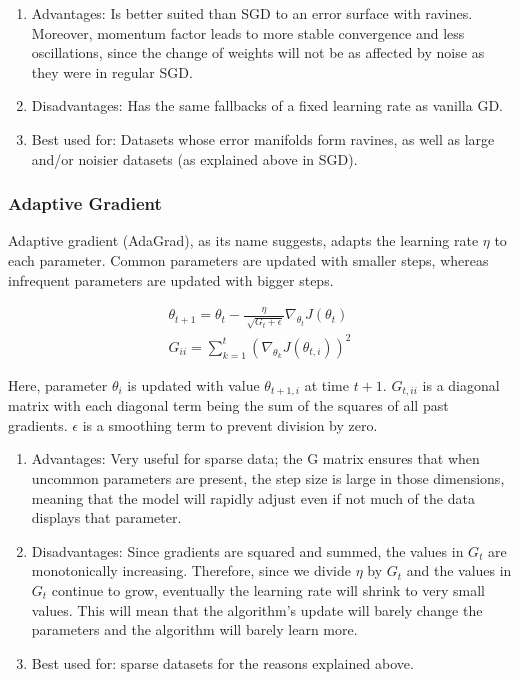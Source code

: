 \documentclass[twoside,11pt]{homework}
\begin{document}
\begin{enumerate}
	\item Advantages: Is better suited than SGD to an error surface with ravines. Moreover, momentum factor leads to more stable convergence and less oscillations, since the change of weights will not be as affected by noise as they were in regular SGD.
	\item Disadvantages: Has the same fallbacks of a fixed learning rate as vanilla GD.
	\item Best used for: Datasets whose error manifolds form ravines, as well as large and/or noisier datasets (as explained above in SGD).
\end{enumerate}

\subsubsection*{Adaptive Gradient}
Adaptive gradient (AdaGrad), as its name suggests, adapts the learning rate $\eta$ to each parameter. Common parameters are updated with smaller steps, whereas infrequent parameters are updated with bigger steps.

\begin{align*}
	\theta_{t+1} = \theta_{t} - \frac{\eta}{\sqrt[]{G_{t}+\epsilon}} \nabla_{\theta_t} J(\theta_{t})\\
	G_{ii} = \sum^t_{k=1} (\nabla_{\theta_k} J(\theta_{t, i}))^2
\end{align*}

Here, parameter $\theta_i$ is updated with value $\theta_{t+1, i}$ at time $t+1$. $G_{t, ii}$ is a diagonal matrix with each diagonal term being the sum of the squares of all past gradients. $\epsilon$ is a smoothing term to prevent division by zero.


\begin{enumerate}
	\item Advantages: Very useful for sparse data; the G matrix ensures that when uncommon parameters are present, the step size is large in those dimensions, meaning that the model will rapidly adjust even if not much of the data displays that parameter.
	\item Disadvantages: Since gradients are squared and summed, the values in $G_t$ are monotonically increasing. Therefore, since we divide $\eta$ by $G_t$ and the values in $G_t$ continue to grow, eventually the learning rate will shrink to very small values. This will mean that the algorithm's update will barely change the parameters and the algorithm will barely learn more.
	\item Best used for: sparse datasets for the reasons explained above.
\end{enumerate}
\end{document}
